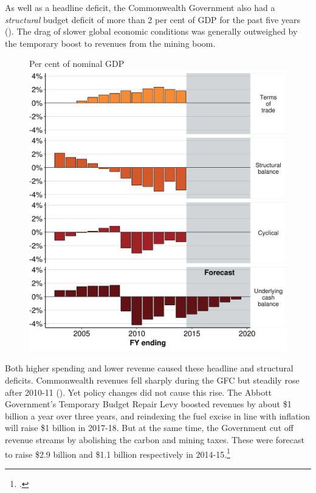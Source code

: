 As well as a headline deficit, the Commonwealth Government also had a \emph{structural} budget deficit of more than 2 per cent of GDP for the past five years (). The drag of slower global economic conditions was generally outweighed by the temporary boost to revenues from the mining boom. 

\begin{figure}
%
{Per cent of nominal GDP}
\includegraphics[width=\columnwidth]{Fiscal-challenges/figure/Figure1-1.pdf}

\end{figure}

Both higher spending and lower revenue caused these headline and structural deficits. Commonwealth revenues fell sharply during the GFC but steadily rose after 2010-11 (). Yet policy changes did not cause this rise. The Abbott Government’s Temporary Budget Repair Levy boosted revenues by about \$1 billion a year over three years, and reindexing the fuel excise in line with inflation will raise \$1 billion in 2017-18. But at the same time, the Government cut off revenue streams by abolishing the carbon and mining taxes. These were forecast to raise \$2.9 billion and \$1.1 billion respectively in 2014-15.\footcite[][55]{Treasury2013-PEFO}  

